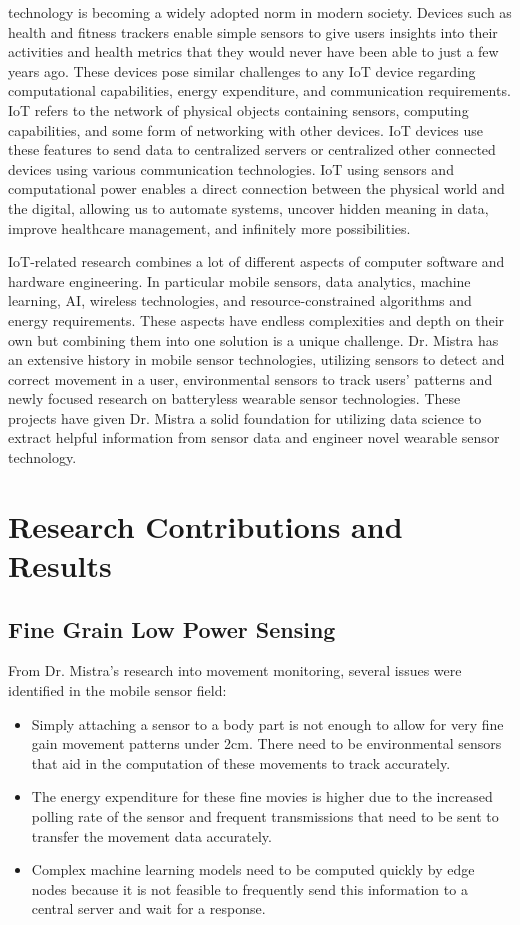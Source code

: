 \documentclass[journal,onecolumn]{IEEEtran}
\begin{document}
 technology is becoming a widely adopted norm in modern society. Devices such as health and fitness trackers enable simple sensors to give users insights into their activities and health metrics that they would never have been able to just a few years ago. These devices pose similar challenges to any IoT device regarding computational capabilities, energy expenditure, and communication requirements. IoT refers to the network of physical objects containing sensors, computing capabilities, and some form of networking with other devices. IoT devices use these features to send data to centralized servers or centralized other connected devices using various communication technologies. IoT using sensors and computational power enables a direct connection between the physical world and the digital, allowing us to automate systems, uncover hidden meaning in data, improve healthcare management, and infinitely more possibilities. 

IoT-related research combines a lot of different aspects of computer software and hardware engineering. In particular mobile sensors, data analytics, machine learning, AI, wireless technologies, and resource-constrained algorithms and energy requirements. These aspects have endless complexities and depth on their own but combining them into one solution is a unique challenge. Dr. Mistra has an extensive history in mobile sensor technologies, utilizing sensors to detect and correct movement in a user, environmental sensors to track users' patterns and newly focused research on batteryless wearable sensor technologies. These projects have given Dr. Mistra a solid foundation for utilizing data science to extract helpful information from sensor data and engineer novel wearable sensor technology. 

\section{Research Contributions and Results}

\subsection{Fine Grain Low Power Sensing}

From Dr. Mistra's research into movement monitoring, several issues were identified in the mobile sensor field:
\begin{itemize}
  \item Simply attaching a sensor to a body part is not enough to allow for very fine gain movement patterns under 2cm. There need to be environmental sensors that aid in the computation of these movements to track accurately.
  \item The energy expenditure for these fine movies is higher due to the increased polling rate of the sensor and frequent transmissions that need to be sent to transfer the movement data accurately.
  \item Complex machine learning models need to be computed quickly by edge nodes because it is not feasible to frequently send this information to a central server and wait for a response. 
\end{itemize}
\end{document}
